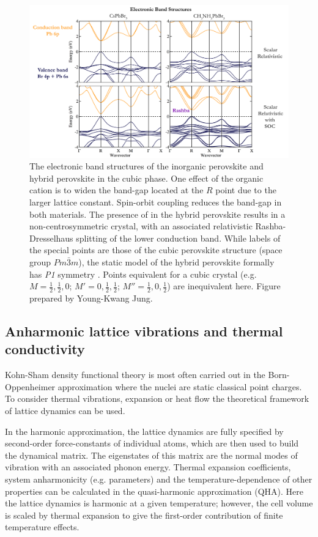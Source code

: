 \begin{figure} \label{f3}
\includegraphics[width=1.0\columnwidth]{./figures/ch2/f3.png}
\caption[Electronic band structures of  and ]{
The electronic band structures of the inorganic perovskite  and hybrid perovskite  in the cubic phase.
    One effect of the organic cation is to widen the band-gap located at the $R$ point due to the larger lattice constant. 
    Spin-orbit coupling reduces the band-gap in both materials. 
The presence of  in the hybrid perovskite results in a non-centrosymmetric crystal, with an associated relativistic Rashba-Dresselhaus splitting of the lower conduction band.
While labels of the special points are those of the cubic perovskite structure (space group $Pm\bar{3}m$),  
    the static model of the hybrid perovskite formally has  \textit{P1} symmetry . 
Points equivalent for a cubic crystal (e.g. $M=\frac{1}{2},\frac{1}{2},0$; $M'=0, \frac{1}{2},\frac{1}{2}$;  $M''=\frac{1}{2},0,\frac{1}{2}$) are inequivalent here. Figure prepared by Young-Kwang Jung.
}
\label{fig3}
\end{figure}

\subsection{Anharmonic lattice vibrations and thermal conductivity} \label{ch2anharmonic}

Kohn-Sham density functional theory is most often carried out in the Born-Oppenheimer approximation where the nuclei are static classical point charges. 
To consider thermal vibrations, expansion or heat flow the theoretical framework of lattice dynamics can be used.\autocite{Stoffel2010} 
 
In the harmonic approximation, the lattice dynamics are fully specified by second-order force-constants of individual atoms, which are then used to build the dynamical matrix. 
The eigenstates of this matrix are the normal modes of vibration with an associated phonon energy. 
Thermal expansion coefficients, system anharmonicity (e.g. \grun parameters) and the temperature-dependence of other properties can be calculated in the quasi-harmonic approximation (QHA). 
Here the lattice dynamics is harmonic at a given temperature; however, the cell volume is scaled by thermal expansion to give the first-order contribution of finite temperature effects. 


